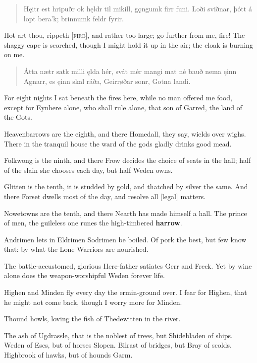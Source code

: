 \bookStart

\begin{verse}
\bva Hęitr est hripuðr \hld ok hęldr til mikill,
\ind gǫngumk firr funi.
Loði sviðnar, \hld þótt á lopt bera'k;
\ind brinnumk feldr fyrir. 
\end{verse}

\bvb Hot art thou, rippeth [\textsc{fire}], and rather too large; go further from me, fire! The shaggy cape is scorched, though I might hold it up in the air; the cloak is burning on me.

\begin{verse}
\bva Átta nætr satk \hld milli ęlda hér,
svát mér mangi \hld mat né bauð
nema ęinn Agnarr, \hld es ęinn skal ráða,
Geirrøðar sonr, \hld Gotna landi.
\end{verse}

\bvb For eight nights I sat beneath the fires here, while no man offered me food, except for Eynhere alone, who shall rule alone, that son of Garred, the land of the Gots.

\bvb Heavenbarrows are the eighth, and there Homedall, they say, wields over wighs. There in the tranquil house the ward of the gods gladly drinks good mead.

\bvb Folkwong is the ninth, and there Frow decides the choice of seats in the hall; half of the slain she chooses each day, but half Weden owns.

\bvb Glitten is the tenth, it is studded by gold, and thatched by silver the same. And there Forset dwells most of the day, and resolve all [legal] matters.

\bvb Nowetowns are the tenth, and there Nearth has made himself a hall. The prince of men, the guileless one runes the high-timbered \textbf{harrow}.

\bvb Andrimen lets in Eldrimen Sodrimen be boiled. Of pork the best, but few know that: by what the Lone Warriors are nourished.

\bvb The battle-accustomed, glorious Here-father satiates Gerr and Freck. Yet by wine alone does the weapon-worshipful Weden forever life.

\bvb Highen and Minden fly every day the ermin-ground over. I fear for Highen, that he might not come back, though I worry more for Minden.

\bvb Thound howls, loving the fish of Thedewitten in the river.

\bvb The ash of Ugdrassle, that is the noblest of trees, but Shidebladen of ships. Weden of Eses, but of horses Slopen. Bilrast of bridges, but Bray of scolds. Highbrook of hawks, but of hounds Garm.
